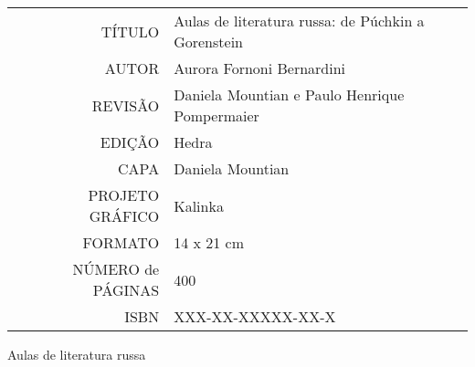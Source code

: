 \bigskip

\begin{vplace}[1]
\begin{table}[ht!]
\MyriadPro
\scriptsize
\begin{tabular}{rl}
TÍTULO            & Aulas de literatura russa: de Púchkin a Gorenstein \\[2pt]
AUTOR             & Aurora Fornoni Bernardini                          \\[2pt]
REVISÃO           & Daniela Mountian e Paulo Henrique Pompermaier      \\[2pt]
EDIÇÃO            & Hedra                                              \\[2pt]
CAPA              & Daniela Mountian                                   \\[2pt]
PROJETO GRÁFICO   & Kalinka                                            \\[2pt]
FORMATO           & 14 x 21 cm                                         \\[2pt]
NÚMERO de PÁGINAS & 400                                                \\[2pt]
ISBN              & XXX-XX-XXXXX-XX-X                                 
\end{tabular}
\end{table}
\end{vplace}

\newpage
\MyriadPro
\begin{center}
\small
Aulas de literatura russa
\end{center}

\scriptsize

